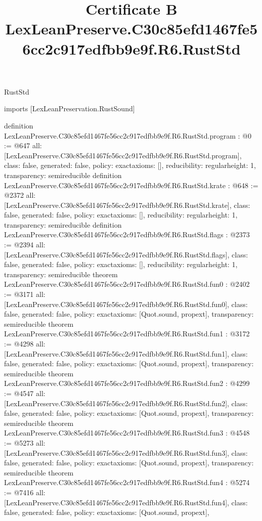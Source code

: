 \begin{lexlean}{RustStd}
\title{Certificate B LexLeanPreserve.C30c85efd1467fe56cc2c917edfbb9e9f.R6.RustStd}
\begin{coremodule}
imports [LexLeanPreservation.RustSound]

definition LexLeanPreserve.C30c85efd1467fe56cc2c917edfbb9e9f.R6.RustStd.program : @0 := @647 {
  all: [LexLeanPreserve.C30c85efd1467fe56cc2c917edfbb9e9f.R6.RustStd.program],
  class: false,
  generated: false,
  policy: exact{axioms: []},
  reducibility: regular{height: 1},
  transparency: semireducible
}
definition LexLeanPreserve.C30c85efd1467fe56cc2c917edfbb9e9f.R6.RustStd.krate : @648 := @2372 {
  all: [LexLeanPreserve.C30c85efd1467fe56cc2c917edfbb9e9f.R6.RustStd.krate],
  class: false,
  generated: false,
  policy: exact{axioms: []},
  reducibility: regular{height: 1},
  transparency: semireducible
}
definition LexLeanPreserve.C30c85efd1467fe56cc2c917edfbb9e9f.R6.RustStd.flags : @2373 := @2394 {
  all: [LexLeanPreserve.C30c85efd1467fe56cc2c917edfbb9e9f.R6.RustStd.flags],
  class: false,
  generated: false,
  policy: exact{axioms: []},
  reducibility: regular{height: 1},
  transparency: semireducible
}
theorem LexLeanPreserve.C30c85efd1467fe56cc2c917edfbb9e9f.R6.RustStd.fun0 : @2402 := @3171 {
  all: [LexLeanPreserve.C30c85efd1467fe56cc2c917edfbb9e9f.R6.RustStd.fun0],
  class: false,
  generated: false,
  policy: exact{axioms: [Quot.sound, propext]},
  transparency: semireducible
}
theorem LexLeanPreserve.C30c85efd1467fe56cc2c917edfbb9e9f.R6.RustStd.fun1 : @3172 := @4298 {
  all: [LexLeanPreserve.C30c85efd1467fe56cc2c917edfbb9e9f.R6.RustStd.fun1],
  class: false,
  generated: false,
  policy: exact{axioms: [Quot.sound, propext]},
  transparency: semireducible
}
theorem LexLeanPreserve.C30c85efd1467fe56cc2c917edfbb9e9f.R6.RustStd.fun2 : @4299 := @4547 {
  all: [LexLeanPreserve.C30c85efd1467fe56cc2c917edfbb9e9f.R6.RustStd.fun2],
  class: false,
  generated: false,
  policy: exact{axioms: [Quot.sound, propext]},
  transparency: semireducible
}
theorem LexLeanPreserve.C30c85efd1467fe56cc2c917edfbb9e9f.R6.RustStd.fun3 : @4548 := @5273 {
  all: [LexLeanPreserve.C30c85efd1467fe56cc2c917edfbb9e9f.R6.RustStd.fun3],
  class: false,
  generated: false,
  policy: exact{axioms: [Quot.sound, propext]},
  transparency: semireducible
}
theorem LexLeanPreserve.C30c85efd1467fe56cc2c917edfbb9e9f.R6.RustStd.fun4 : @5274 := @7416 {
  all: [LexLeanPreserve.C30c85efd1467fe56cc2c917edfbb9e9f.R6.RustStd.fun4],
  class: false,
  generated: false,
  policy: exact{axioms: [Quot.sound, propext]},
}
\end{coremodule}
\end{lexlean}
